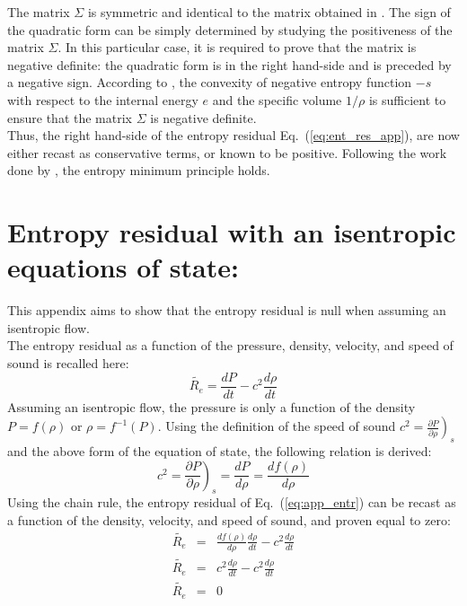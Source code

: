 \documentclass[preprint,10pt]{elsarticle}
\newcommand{\resi}{R_e}
\newcommand{\resinew}{\widetilde{\resi}}
\newcommand{\eqt}[1]{Eq.~(\ref{#1})}                     %
\begin{document}
%
The matrix $\Sigma$ is symmetric and identical to the matrix obtained in \cite{jlg}. The sign of the quadratic form can be simply determined by studying the positiveness of the matrix $\Sigma$. In this particular case, it is required to prove that the matrix is negative definite: the quadratic form is in the right hand-side and is preceded by a negative sign. According to \cite{jlg}, the convexity of negative entropy function $-s$ with respect to the internal energy $e$ and the specific volume $1/ \rho$ is sufficient to ensure that the matrix $\Sigma$ is negative definite. \\
Thus, the right hand-side of the entropy residual \eqt{eq:ent_res_app}, are now either recast as conservative terms, or known to be positive. Following the work done by \cite{jlg}, the entropy minimum principle holds.

\newpage
\section{Entropy residual with an isentropic equations of state:} \label{app:ise_equ}

This appendix aims to show that the entropy residual is null when assuming an isentropic flow. \\
The entropy residual as a function of the pressure, density, velocity, and speed of sound is recalled here:
%
\begin{equation}\label{eq:app_entr}
\resinew = \frac{dP}{dt} - c^2 \frac{d \rho}{dt}
\end{equation}
%
Assuming an isentropic flow, the pressure is only a function of the density $P = f( \rho )$ or $\rho = f^{-1}( P )$. Using the definition of the speed of sound $c^2 = \left. \frac{\partial P}{\partial \rho} \right)_s$ and the above form of the equation of state, the following relation is derived:
%
\begin{equation}\label{eq:app_sp}
c^2 = \left. \frac{\partial P}{\partial \rho} \right)_s = \frac{d P}{d \rho} = \frac{d f(\rho)}{d \rho}
\end{equation}
%
Using the chain rule, the entropy residual of \eqt{eq:app_entr} can be recast as a function of the density, velocity, and speed of sound, and proven equal to zero:
%
\begin{eqnarray*}
\resinew &=& \frac{d f(\rho)}{d \rho} \frac{d\rho}{dt} - c^2 \frac{d \rho}{dt} \\
\resinew &=& c^2 \frac{d\rho}{dt} - c^2 \frac{d \rho}{dt} \\
\resinew &=&  0 
\end{eqnarray*}

\end{document}

